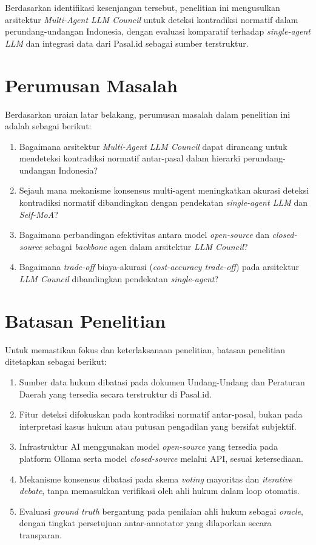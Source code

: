 Berdasarkan identifikasi kesenjangan tersebut, penelitian ini mengusulkan arsitektur \textit{Multi-Agent LLM Council} untuk deteksi kontradiksi normatif dalam perundang-undangan Indonesia, dengan evaluasi komparatif terhadap \textit{single-agent LLM} dan integrasi data dari Pasal.id sebagai sumber terstruktur.

\section{Perumusan Masalah}
Berdasarkan uraian latar belakang, perumusan masalah dalam penelitian ini adalah sebagai berikut:
\begin{enumerate}
	\item Bagaimana arsitektur \textit{Multi-Agent LLM Council} dapat dirancang untuk mendeteksi kontradiksi normatif antar-pasal dalam hierarki perundang-undangan Indonesia?
	\item Sejauh mana mekanisme konsensus multi-agent meningkatkan akurasi deteksi kontradiksi normatif dibandingkan dengan pendekatan \textit{single-agent LLM} dan \textit{Self-MoA}?
	\item Bagaimana perbandingan efektivitas antara model \textit{open-source} dan \textit{closed-source} sebagai \textit{backbone} agen dalam arsitektur \textit{LLM Council}?
	\item Bagaimana \textit{trade-off} biaya-akurasi (\textit{cost-accuracy trade-off}) pada arsitektur \textit{LLM Council} dibandingkan pendekatan \textit{single-agent}?
\end{enumerate}

\section{Batasan Penelitian}
Untuk memastikan fokus dan keterlaksanaan penelitian, batasan penelitian ditetapkan sebagai berikut:
\begin{enumerate}
	\item Sumber data hukum dibatasi pada dokumen Undang-Undang dan Peraturan Daerah yang tersedia secara terstruktur di Pasal.id.
	\item Fitur deteksi difokuskan pada kontradiksi normatif antar-pasal, bukan pada interpretasi kasus hukum atau putusan pengadilan yang bersifat subjektif.
	\item Infrastruktur AI menggunakan model \textit{open-source} yang tersedia pada platform Ollama serta model \textit{closed-source} melalui API, sesuai ketersediaan.
	\item Mekanisme konsensus dibatasi pada skema \textit{voting} mayoritas dan \textit{iterative debate}, tanpa memasukkan verifikasi oleh ahli hukum dalam loop otomatis.
	\item Evaluasi \textit{ground truth} bergantung pada penilaian ahli hukum sebagai \textit{oracle}, dengan tingkat persetujuan antar-annotator yang dilaporkan secara transparan.
\end{enumerate}

